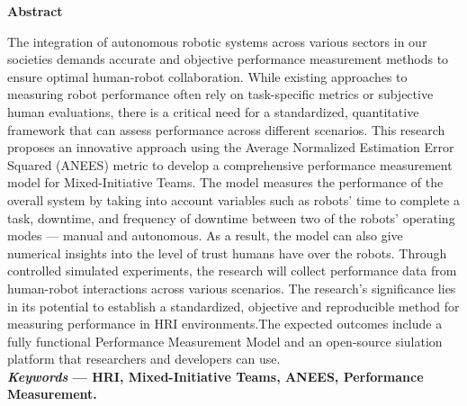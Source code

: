 \begin{center}
	\textbf{\large Abstract}
\end{center}
\noindent
The integration of autonomous robotic systems across various sectors in our societies demands accurate and objective performance measurement methods to ensure optimal human-robot collaboration. While existing approaches to measuring robot performance often rely on task-specific metrics or subjective human evaluations, there is a critical need for a standardized, quantitative framework that can assess performance across different scenarios. This research proposes an innovative approach using the Average Normalized Estimation Error Squared (ANEES) metric to develop a comprehensive performance measurement model for Mixed-Initiative Teams. The model measures the performance of the overall system by taking into account variables such as robots' time to complete a task, downtime, and frequency of downtime between two of the robots' operating modes --- manual and autonomous. As a result, the model can also give numerical insights into the level of trust humans have over the robots.
Through controlled simulated experiments, the research will collect performance data from human-robot interactions across various scenarios. The research's significance lies in its potential to establish a standardized, objective and reproducible method for measuring performance in HRI environments.The expected outcomes include a fully functional Performance Measurement Model and an open-source siulation platform that researchers and developers can use.
\\
\textbf{\textit{Keywords} --- HRI, Mixed-Initiative Teams, ANEES, Performance Measurement.}
